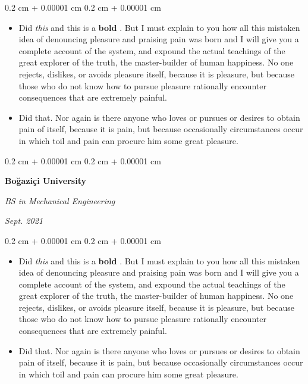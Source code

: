 \documentclass[10pt, letterpaper]{article}
\newenvironment{highlights}{
    \begin{itemize}[
        topsep=0.10 cm,
        parsep=0.10 cm,
        partopsep=0pt,
        itemsep=0pt,
        leftmargin=0.4 cm + 10pt
    ]
}{
    \end{itemize}
} %
\newenvironment{onecolentry}{
    \begin{adjustwidth}{
        0.2 cm + 0.00001 cm
    }{
        0.2 cm + 0.00001 cm
    }
}{
    \end{adjustwidth}
} %
\newenvironment{twocolentry}[2][]{
    \onecolentry
    \def\secondColumn{#2}
    \setcolumnwidth{\fill, 4.5 cm}
    \begin{paracol}{2}
}{
    \switchcolumn \raggedleft \secondColumn
    \end{paracol}
    \endonecolentry
} %
\let\hrefWithoutArrow\href
\renewcommand{\href}[2]{\hrefWithoutArrow{#1}{\mbox{\ifthenelse{\equal{#2}{}}{ }{#2 }\raisebox{.15ex}{\footnotesize \faExternalLink*}}}}
\begin{document}
        \vspace{0.10 cm-3px}
        \begin{onecolentry}
            \begin{highlights}
                \item Did \textit{this} and this is a \textbf{bold} \href{https://example.com}{link}. But I must explain to you how all this mistaken idea of denouncing pleasure and praising pain was born and I will give you a complete account of the system, and expound the actual teachings of the great explorer of the truth, the master-builder of human happiness. No one rejects, dislikes, or avoids pleasure itself, because it is pleasure, but because those who do not know how to pursue pleasure rationally encounter consequences that are extremely painful.
                \item Did that. Nor again is there anyone who loves or pursues or desires to obtain pain of itself, because it is pain, but because occasionally circumstances occur in which toil and pain can procure him some great pleasure.
            \end{highlights}
        \end{onecolentry}


        \vspace{0.2 cm-3px}

        \begin{twocolentry}{
            
            
        \textit{Sept. 2021}}
            \textbf{Boğaziçi University}

            \textit{BS in Mechanical Engineering}
        \end{twocolentry}

        \vspace{0.10 cm-3px}
        \begin{onecolentry}
            \begin{highlights}
                \item Did \textit{this} and this is a \textbf{bold} \href{https://example.com}{link}. But I must explain to you how all this mistaken idea of denouncing pleasure and praising pain was born and I will give you a complete account of the system, and expound the actual teachings of the great explorer of the truth, the master-builder of human happiness. No one rejects, dislikes, or avoids pleasure itself, because it is pleasure, but because those who do not know how to pursue pleasure rationally encounter consequences that are extremely painful.
                \item Did that. Nor again is there anyone who loves or pursues or desires to obtain pain of itself, because it is pain, but because occasionally circumstances occur in which toil and pain can procure him some great pleasure.
            \end{highlights}
        \end{onecolentry}
\end{document}
